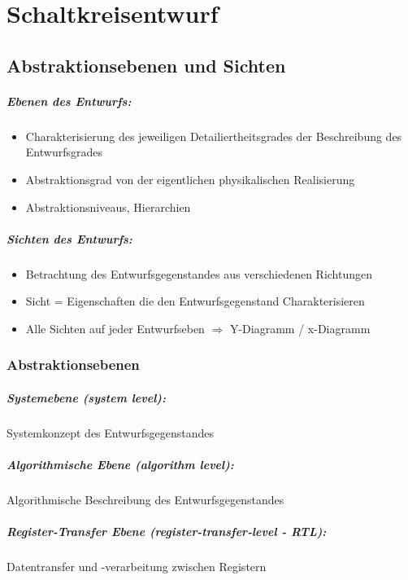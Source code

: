 \chapter{Schaltkreisentwurf}

\section{Abstraktionsebenen und Sichten}
	\paragraph{Ebenen des Entwurfs:}
	\begin{itemize}
		\item Charakterisierung des jeweiligen Detailiertheitsgrades der Beschreibung des Entwurfsgrades
		\item Abstraktionsgrad von der eigentlichen physikalischen Realisierung
		\item Abstraktionsniveaus, Hierarchien
	\end{itemize}

	\paragraph{Sichten des Entwurfs:}
	\begin{itemize}
		\item Betrachtung des Entwurfsgegenstandes aus verschiedenen Richtungen
		\item Sicht = Eigenschaften die den Entwurfsgegenstand Charakterisieren
		\item Alle Sichten auf jeder Entwurfseben $\Rightarrow$ Y-Diagramm / x-Diagramm
	\end{itemize}

\subsection{Abstraktionsebenen}
	\paragraph{Systemebene (system level):} Systemkonzept des Entwurfsgegenstandes
	\paragraph{Algorithmische Ebene (algorithm level):} Algorithmische Beschreibung des Entwurfsgegenstandes
	\paragraph{Register-Transfer Ebene (register-transfer-level - RTL):} Datentransfer und -verarbeitung zwischen Registern
